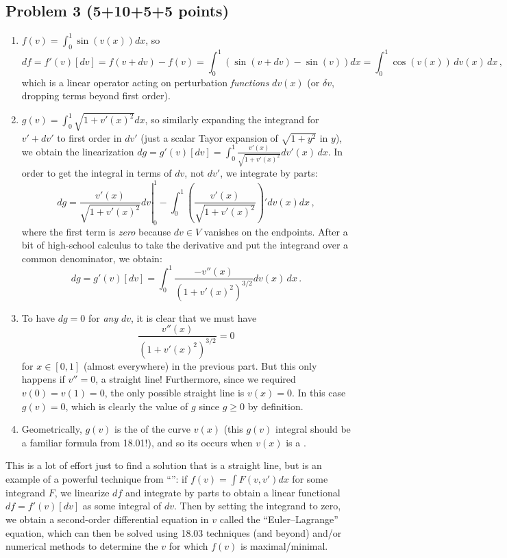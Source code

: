 \documentclass[10pt,oneside]{article}
\begin{document}
\subsection*{Problem 3 (5+10+5+5 points)}


\begin{enumerate}[label=\alph*)]

\item $f(v) = \int_0^1 \sin(v(x)) dx$, so $$df = f'(v)[dv] = f(v+dv)-f(v) = \int_0^1 \left( \sin(v+dv) - \sin(v)\right) dx = \boxed{ \int_0^1 \cos(v(x))\,dv(x) \, dx} \, ,$$ which is a linear operator acting on perturbation \emph{functions} $dv(x)$ (or $\delta v$, dropping terms beyond first order).

\item $g(v) = \int_0^1 \sqrt{1 + v'(x)^2} dx$, so similarly expanding the integrand for $v' + dv'$ to first order in $dv'$ (just a scalar Tayor expansion of $\sqrt{1+y^2}$ in $y$), we obtain the linearization $dg = g'(v)[dv] = \int_0^1 \frac{v'(x)}{\sqrt{1 + v'(x)^2}} dv'(x)\, dx$.  In order to get the integral in terms of $dv$, not $dv'$, we integrate by parts:
$$
dg = \left. \frac{v'(x)}{\sqrt{1 + v'(x)^2}} dv \right|_0^1 - \int_0^1 \left(\frac{v'(x)}{\sqrt{1 + v'(x)^2}}\right)' dv(x) dx \, ,
$$
where the first term is \emph{zero} because $dv \in V$ vanishes on the endpoints.  After a bit of high-school calculus to take the derivative and put the integrand over a common denominator, we obtain:
$$
\boxed{dg = g'(v)[dv] = \int_0^1 \frac{- v''(x)}{(1+v'(x)^2)^{3/2}} dv(x) \, dx}\, .
$$

\item To have $dg = 0$ for \emph{any} $dv$, it is clear that we must have $$ \frac{ v''(x)}{(1+v'(x)^2)^{3/2}} = 0 $$ for $x \in [0,1]$ (almost everywhere) in the previous part.  But this only happens if $\boxed{v'' = 0}$, a straight line!  Furthermore, since we required $v(0)=v(1)=0$, the only possible straight line is $\boxed{v(x) = 0}$.   In this case $g(v) = 0$, which is clearly the  value of $g$ since $g \ge 0$ by definition.

\item Geometrically, $g(v)$ is the  of the curve $v(x)$ (this $g(v)$ integral should be a familiar formula from 18.01!), and so its  occurs when $v(x)$ is a .

\end{enumerate}

This is a lot of effort just to find a solution that is a straight line, but is an example of a powerful technique from ``'': if $f(v) = \int F(v,v')dx$ for some integrand $F$, we linearize $df$ and integrate by parts to obtain a linear functional $df = f'(v)[dv]$ as some integral of $dv$.   Then by setting the integrand to zero, we obtain a second-order differential equation in $v$ called the ``Euler--Lagrange'' equation, which can then be solved using 18.03 techniques (and beyond) and/or numerical methods to determine the $v$ for which $f(v)$ is maximal/minimal.
\end{document}
